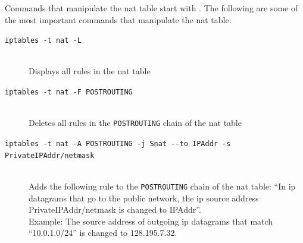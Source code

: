 Commands that manipulate the \ac{nat} table start with . The following are some of the most important commands that manipulate the \ac{nat} table:
\begin{framed}
	\begin{description}
		\item[\texttt{iptables -t nat -L}] \hfill \\
			Displays all rules in the \ac{nat} table
		\item[\texttt{iptables -t nat -F POSTROUTING}] \hfill \\
			Deletes all rules in the \texttt{POSTROUTING} chain of the \ac{nat} table
		\item[\texttt{iptables -t nat -A POSTROUTING -j S\ac{nat} -{}-to IPAddr -s PrivateIPAddr/netmask}] \hfill \\
			Adds the following rule to the \texttt{POSTROUTING} chain of the \ac{nat} table: ``In \acs{ip} datagrams that go to the public network, the \acs{ip} source address PrivateIPAddr/netmask is changed to IPAddr''.\\
			Example: The source address of outgoing \acs{ip} datagrams that match ``10.0.1.0/24'' is changed to 128.195.7.32.\\
	\end{description}
\end{framed}


